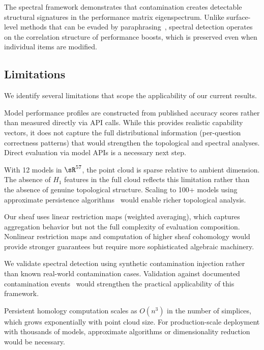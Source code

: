 The spectral framework demonstrates that contamination creates detectable structural signatures in the performance matrix eigenspectrum.
Unlike surface-level methods that can be evaded by paraphrasing~\citep{yang2023rethinking}, spectral detection operates on the correlation structure of performance boosts, which is preserved even when individual items are modified.

\subsection{Limitations}

We identify several limitations that scope the applicability of our current results.

Model performance profiles are constructed from published accuracy scores rather than measured directly via API calls.
While this provides realistic capability vectors, it does not capture the full distributional information (\eg per-question correctness patterns) that would strengthen the topological and spectral analyses.
Direct evaluation via model APIs is a necessary next step.

With 12 models in $\sR^{57}$, the point cloud is sparse relative to ambient dimension.
The absence of $H_1$ features in the full cloud reflects this limitation rather than the absence of genuine topological structure.
Scaling to 100+ models using approximate persistence algorithms~\citep{sheehy2013linear} would enable richer topological analysis.

Our sheaf uses linear restriction maps (weighted averaging), which captures aggregation behavior but not the full complexity of evaluation composition.
Nonlinear restriction maps and computation of higher sheaf cohomology would provide stronger guarantees but require more sophisticated algebraic machinery.

We validate spectral detection using synthetic contamination injection rather than known real-world contamination cases.
Validation against documented contamination events~\citep{shi2023detecting, xu2024contamination} would strengthen the practical applicability of this framework.

Persistent homology computation scales as $O(n^3)$ in the number of simplices, which grows exponentially with point cloud size.
For production-scale deployment with thousands of models, approximate algorithms or dimensionality reduction would be necessary.

